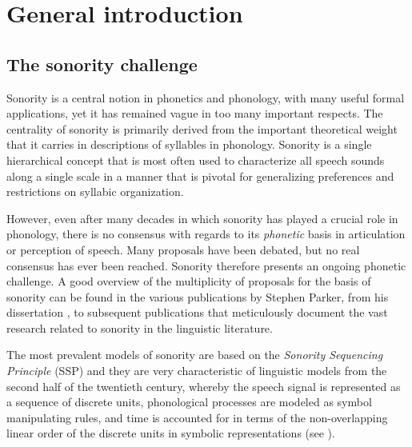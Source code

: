 \chapter{General introduction}\label{sec:genIntro}

\section{The sonority challenge}\label{the-sonority-challenge}\largerpage[2]

Sonority is a central notion in phonetics and phonology, with many useful formal applications, yet it has remained vague in too many important respects.
The centrality of sonority is primarily derived from the important theoretical weight that it carries in descriptions of syllables in phonology. Sonority is a single hierarchical concept that is most often used to characterize all speech sounds along a single scale in a manner that is pivotal for generalizing preferences and restrictions on syllabic organization.

However, even after many decades in which sonority has played a crucial role in phonology, there is no consensus with regards to its \emph{phonetic} basis in articulation or perception of speech. Many proposals have been debated, but no real consensus has ever been reached.
Sonority therefore presents an ongoing phonetic challenge.
A good overview of the multiplicity of proposals for the basis of sonority can be found in the various publications by Stephen Parker, from his dissertation \citep{parker2002quantifying}, to subsequent publications \citep[like][]{Parker:TheSonorityControversy:2012, parker2017sounding, parker2018abib} that meticulously document the vast research related to sonority in the linguistic literature.

The most prevalent models of sonority are based on the \emph{Sonority Sequencing Principle} (SSP) and they are very characteristic of linguistic models from the second half of the twentieth century, whereby the speech signal is represented as a sequence of discrete units, phonological processes are modeled as symbol manipulating rules, and time is accounted for in terms of the non-overlapping linear order of the discrete units in symbolic representations (see ).

